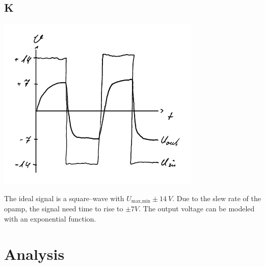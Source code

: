 \documentclass[a4paper,10pt]{article}
\newenvironment{Figure}
        {\par\medskip\noindent\minipage{\linewidth}}
        {\endminipage\par\medskip}
\numberwithin{equation}{section}
\begin{document}
\begin{multicols}{2}
        \subsection{K} \label{pre:K}
        \begin{Figure}
                \centering
                \includegraphics[width=\textwidth]{../plot/preK_crop.pdf}
        \end{Figure}
        \noindent The ideal signal is a square--wave with $U_\text{max,min}\pm \SI{14}{V}$.
        Due to the slew rate of the opamp, the signal need time to rise to $\pm \si{7}{V}$.
        The output voltage can be modeled with an exponential function.

        \newpage
        \section{Analysis}


\end{multicols}
\end{document}
